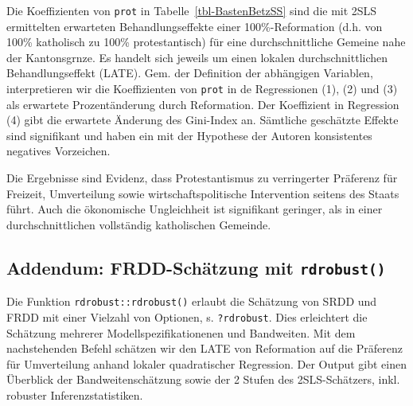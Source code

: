 \documentclass[
  a4paper,
  DIV=11,
  oneside]{scrreprt}
\newenvironment{Shaded}{\begin{snugshade}}{\end{snugshade}}
\newcommand{\AttributeTok}[1]{\textcolor[rgb]{0.40,0.45,0.13}{#1}}
\newcommand{\DecValTok}[1]{\textcolor[rgb]{0.68,0.00,0.00}{#1}}
\newcommand{\FunctionTok}[1]{\textcolor[rgb]{0.28,0.35,0.67}{#1}}
\newcommand{\NormalTok}[1]{\textcolor[rgb]{0.00,0.23,0.31}{#1}}
\newcommand{\OtherTok}[1]{\textcolor[rgb]{0.00,0.23,0.31}{#1}}
\newcommand{\SpecialCharTok}[1]{\textcolor[rgb]{0.37,0.37,0.37}{#1}}
\newcommand{\StringTok}[1]{\textcolor[rgb]{0.13,0.47,0.30}{#1}}
\begin{document}
Die Koeffizienten von \texttt{prot} in Tabelle~\ref{tbl-BastenBetzSS}
sind die mit 2SLS ermittelten erwarteten Behandlungseffekte einer
100\%-Reformation (d.h. von 100\% katholisch zu 100\% protestantisch)
für eine durchschnittliche Gemeine nahe der Kantonsgrnze. Es handelt
sich jeweils um einen lokalen durchschnittlichen Behandlungseffekt
(LATE). Gem. der Definition der abhängigen Variablen, interpretieren wir
die Koeffizienten von \texttt{prot} in de Regressionen (1), (2) und (3)
als erwartete Prozentänderung durch Reformation. Der Koeffizient in
Regression (4) gibt die erwartete Änderung des Gini-Index an. Sämtliche
geschätzte Effekte sind signifikant und haben ein mit der Hypothese der
Autoren konsistentes negatives Vorzeichen.

Die Ergebnisse sind Evidenz, dass Protestantismus zu verringerter
Präferenz für Freizeit, Umverteilung sowie wirtschaftspolitische
Intervention seitens des Staats führt. Auch die ökonomische Ungleichheit
ist signifikant geringer, als in einer durchschnittlichen vollständig
katholischen Gemeinde.

\subsection{\texorpdfstring{Addendum: FRDD-Schätzung mit
\texttt{rdrobust()}}{Addendum: FRDD-Schätzung mit rdrobust()}}\label{addendum-frdd-schuxe4tzung-mit-rdrobust}

Die Funktion \texttt{rdrobust::rdrobust()} erlaubt die Schätzung von
SRDD und FRDD mit einer Vielzahl von Optionen, s. \texttt{?rdrobust}.
Dies erleichtert die Schätzung mehrerer Modellspezifikationenen und
Bandweiten. Mit dem nachstehenden Befehl schätzen wir den LATE von
Reformation auf die Präferenz für Umverteilung anhand lokaler
quadratischer Regression. Der Output gibt einen Überblick der
Bandweitenschätzung sowie der 2 Stufen des 2SLS-Schätzers, inkl.
robuster Inferenzstatistiken.

\begin{Shaded}
\end{Shaded}
\end{document}
